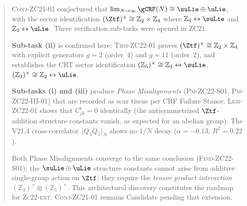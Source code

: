 \documentclass[12pt, a4paper]{article}
\begin{document}

\thispagestyle{empty}

\begin{abstract}
\noindent
\textsc{Conj-ZC21-01} conjectured that $\lim_{N\to\infty}\gCRF(N)\cong\suLie\oplus\uLie$,
with the sector identification $(\Ztf)^\times \cong \mathbb{Z}_2\times\mathbb{Z}_4$
where $\mathbb{Z}_4 \leftrightarrow \suLie$ and $\mathbb{Z}_2 \leftrightarrow \uLie$.
Three verification sub-tasks were opened in ZC21.

\textbf{Sub-task (ii)} is confirmed here:
\textsc{Thm-ZC22-01} proves $({\Ztf})^\times \cong \mathbb{Z}_2 \times \mathbb{Z}_4$
with explicit generators $g=2$ (order~4) and $g=11$ (order~2),
and establishes the CRT sector identification
$(\mathbb{Z}_5)^\times \cong \mathbb{Z}_4 \leftrightarrow \suLie$,
$(\mathbb{Z}_3)^\times \cong \mathbb{Z}_2 \leftrightarrow \uLie$.

\textbf{Sub-tasks (i) and (iii)} produce \emph{Phase Misalignments}
(\textsc{Pm-ZC22-S01}, \textsc{Pm-ZC22-III-01}) that are recorded
as scar tissue per CRF Failure Stance.
\textsc{Lem-ZC22-01} shows that $C^l_{jk} = 0$ identically
(the antisymmetrized $\Ztf$-addition structure constants vanish,
as expected for an abelian group).
The V21.4 cross-correlator $\langle Q_3 Q_5\rangle_N$
shows no $1/N$ decay ($\alpha = -0.13$, $R^2 = 0.22$).

Both Phase Misalignments converge to the same conclusion (\textsc{Find-ZC22-S01}):
the $\suLie\oplus\uLie$ structure constants cannot arise from
additive single-group action on $\Ztf$;
they require the \emph{tensor product interaction}
$(\mathbb{Z}_3)^\times \otimes (\mathbb{Z}_5)^\times$.
This architectural discovery constitutes the roadmap for \textsc{Zc22-ext}.
\textsc{Conj-ZC21-01} remains Candidate pending that extension.
\end{abstract}
\end{document}
